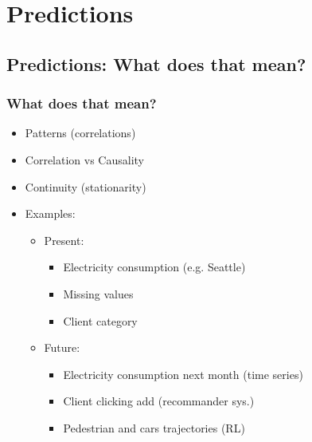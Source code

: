 



\begin{frame}
   \titlepage
\end{frame}



\begin{frame}
   \tableofcontents
\end{frame}

\section{Predictions}


\subsection{Predictions: What does that mean?}

\begin{frame}\frametitle{What does that mean?}
   \begin{itemize}
      \item Patterns (correlations)
      \item Correlation vs Causality
      \item Continuity (stationarity)
      \item Examples:
      \begin{itemize}
         \item Present:
         \begin{itemize}
            \item Electricity consumption (e.g. Seattle)
            \item Missing values
            \item Client category
         \end{itemize}
         \item Future:
         \begin{itemize}
            \item Electricity consumption next month (time series)
            \item Client clicking add (recommander sys.)
            \item Pedestrian and cars trajectories (RL)
         \end{itemize}
      \end{itemize}
   \end{itemize}
\end{frame}


